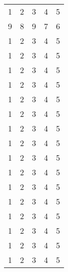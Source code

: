 \documentclass{article}
\begin{document}
\begin{longtable}{lllll}
    1        & 2        & 3        & 4        & 5               \\

    9        & 8        & 9        & 7        & 6               \\

    1        & 2        & 3        & 4        & 5               \\

    1        & 2        & 3        & 4        & 5               \\

    1        & 2        & 3        & 4        & 5               \\

    1        & 2        & 3        & 4        & 5               \\

    1        & 2        & 3        & 4        & 5               \\

    1        & 2        & 3        & 4        & 5               \\

    1        & 2        & 3        & 4        & 5               \\

    1        & 2        & 3        & 4        & 5               \\

    1        & 2        & 3        & 4        & 5               \\

    1        & 2        & 3        & 4        & 5               \\

    1        & 2        & 3        & 4        & 5               \\

    1        & 2        & 3        & 4        & 5               \\

    1        & 2        & 3        & 4        & 5               \\

    1        & 2        & 3        & 4        & 5               \\

    1        & 2        & 3        & 4        & 5               \\

    1        & 2        & 3        & 4        & 5               \\


\end{longtable}
\end{document}
